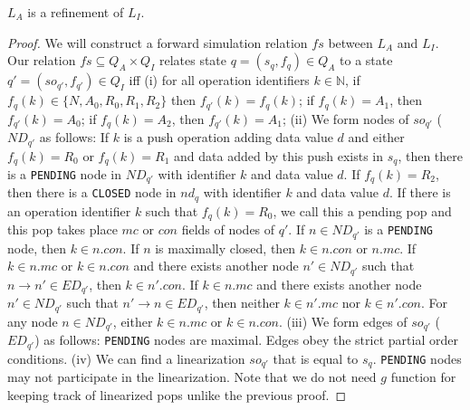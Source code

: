 \begin{lem}
$L_A$ is a refinement of $L_I$.
\end{lem}
\begin{proof}
We will construct a forward simulation relation $fs$ between $L_A$ and $L_I$. Our relation $fs \subseteq Q_A \times Q_I$ relates state $q = (s_q, f_q) \in Q_A$ to a state $q' =(so_{q'}, f_{q'}) \in Q_I$ iff (i) for all operation identifiers $k \in \mathbb{N}$, if $f_q(k) \in \{N, A_0, R_0, R_1, R_2\}$ then $f_{q'}(k) = f_q(k)$; if $f_q(k) = A_1$, then $f_{q'}(k) = A_0$; if $f_q(k) = A_2$, then $f_{q'}(k)= A_1$; (ii) We form nodes of $so_{q'}$ ($ND_{q'}$ as follows:  If $k$ is a push operation adding data value $d$ and either $f_q(k)= R_0$ or $f_q(k)=R_1$ and data added by this push exists in $s_q$, then there is a \texttt{PENDING} node in $ND_{q'}$ with identifier $k$ and data value $d$. If $f_q(k)= R_2$, then there is a \texttt{CLOSED} node in $nd_q$ with identifier $k$ and data value $d$. If there is an operation identifier $k$ such that $f_q(k) = R_0$, we call this a pending pop and this pop takes place $mc$ or $con$ fields of nodes of $q'$. If $n \in ND_{q'}$ is a \texttt{PENDING} node, then $k \in n.con$. If $n$ is maximally closed, then $k \in n.con$ or $n.mc$. If $k \in n.mc$ or $k \in n.con$ and there exists another node $n' \in ND_{q'}$ such that $n \rightarrow n' \in ED_{q'}$, then $k \in n'.con$. If $k \in n.mc$ and there exists another node $n' \in ND_{q'}$ such that $n' \rightarrow n \in ED_{q'}$, then neither $k \in n'.mc$ nor $k \in n'.con$. For any node $n \in ND_{q'}$, either $k \in n.mc$ or $k \in n.con$. (iii) We form edges of $so_{q'}$ ($ED_{q'}$) as follows: \texttt{PENDING} nodes are maximal. Edges obey the strict partial order conditions. (iv) We can find a linearization $so_{q'}$ that is equal to $s_q$. \texttt{PENDING} nodes may not participate in the linearization. Note that we do not need $g$ function for keeping track of linearized pops unlike the previous proof.


\end{proof}
